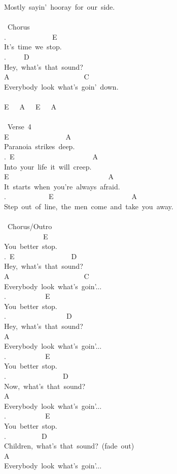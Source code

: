 {Mostly\ sayin'\ hooray\ for\ our\ side.\\
\\
\lbrack\ Chorus\rbrack\\
.\ \ \ \ \ \ \ \ \ \ \ \ \ E\\
It's\ time\ we\ stop.\\
.\ \ \ \ \ D\\
Hey,\ what's\ that\ sound?\\
A\ \ \ \ \ \ \ \ \ \ \ \ \ \ \ \ \ \ \ \ \ C\\
Everybody\ look\ what's\ goin'\ down.\\
\\
E\ \ \ A\ \ \ E\ \ \ A\\
\\
\lbrack\ Verse\ 4\rbrack\\
E\ \ \ \ \ \ \ \ \ \ \ \ \ \ \ \ A\\
Paranoia\ strikes\ deep.\\
.\ E\ \ \ \ \ \ \ \ \ \ \ \ \ \ \ \ \ \ \ \ \ \ A\\
Into\ your\ life\ it\ will\ creep.\\
E\ \ \ \ \ \ \ \ \ \ \ \ \ \ \ \ \ \ \ \ \ \ \ \ \ \ \ \ A\\
It\ starts\ when\ you're\ always\ afraid.\\
.\ \ \ \ \ \ \ \ \ \ \ \ E\ \ \ \ \ \ \ \ \ \ \ \ \ \ \ \ \ \ \ \ \ \ A\\
Step\ out\ of\ line,\ the\ men\ come\ and\ take\ you\ away.\\
\\
\lbrack\ Chorus/Outro\rbrack\\
\ \ \ \ \ \ \ \ \ \ \ E\\
You\ better\ stop.\\
.\ E\ \ \ \ \ \ \ \ \ \ \ \ \ \ \ \ D\\
Hey,\ what's\ that\ sound?\\
A\ \ \ \ \ \ \ \ \ \ \ \ \ \ \ \ \ \ \ \ \ C\\
Everybody\ look\ what's\ goin'...\\
.\ \ \ \ \ \ \ \ \ \ \ E\\
You\ better\ stop.\\
.\ \ \ \ \ \ \ \ \ \ \ \ \ \ \ \ \ D\\
Hey,\ what's\ that\ sound?\\
A\\
Everybody\ look\ what's\ goin'...\\
.\ \ \ \ \ \ \ \ \ \ \ E\\
You\ better\ stop.\\
.\ \ \ \ \ \ \ \ \ \ \ \ \ \ \ \ D\\
Now,\ what's\ that\ sound?\\
A\\
Everybody\ look\ what's\ goin'...\\
.\ \ \ \ \ \ \ \ \ \ \ E\\
You\ better\ stop.\\
.\ \ \ \ \ \ \ \ \ \ D\\
Children,\ what's\ that\ sound?\ (fade\ out)\\
A\\
Everybody\ look\ what's\ goin'...}

